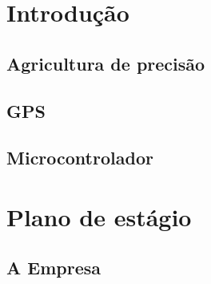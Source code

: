 \section{Introdução} %

\subsection{Agricultura de precisão}



\subsection{GPS}



\subsection{Microcontrolador}








\section{Plano de estágio}

\subsection{A Empresa}

